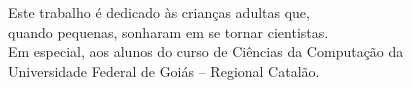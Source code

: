 Este trabalho é dedicado às crianças adultas que,\\
quando pequenas, sonharam em se tornar cientistas. \\
Em especial, aos alunos do curso de Ciências da Computação da \\
Universidade Federal de Goiás -- Regional Catalão.

